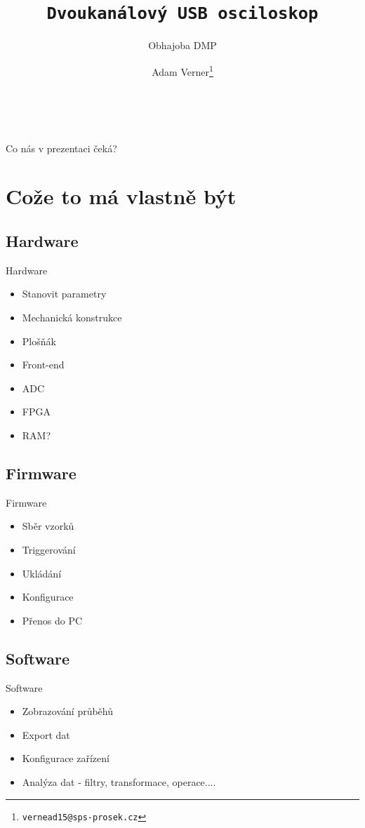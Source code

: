 \documentclass{beamer}
\title{\texttt{\LARGE Dvoukanálový USB osciloskop}}
\subtitle{ Obhajoba DMP }
\author{ Adam Verner\footnote{\texttt{vernead15@sps-prosek.cz}}}
\begin{document}
\begin{frame}
  \maketitle \\
\end{frame}

\begin{frame}{Co nás v prezentaci čeká?}
  \tableofcontents
\end{frame}

\section{Cože to má vlastně být}


	\subsection{Hardware}
	\begin{frame}{Hardware}
		\begin{itemize}
			\item Stanovit parametry
			\item Mechanická konstrukce
			\item Plošňák
			\item Front-end
			\item ADC
			\item FPGA
			\item RAM?
		\end{itemize}
	\end{frame}
	
	\subsection{Firmware}
	\begin{frame}{Firmware}
		\begin{itemize}
			\item Sběr vzorků
			\item Triggerování
			\item Ukládání
			\item Konfigurace
			\item Přenos do PC
		\end{itemize}
	\end{frame}
	
	\subsection{Software}
	\begin{frame}{Software}
		\begin{itemize}
			\item Zobrazování průběhů
			\item Export dat
			\item Konfigurace zařízení
			\item Analýza dat - filtry, transformace, operace....
		\end{itemize}
	\end{frame}
\end{document}
